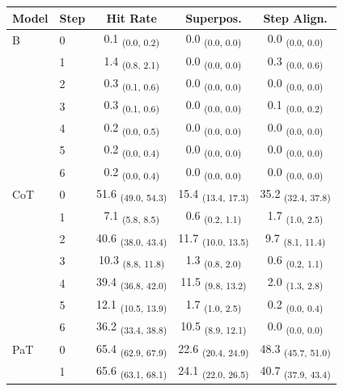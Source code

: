 \begin{table}[h!]
\centering
\small
\begin{tabular}{ll ccc}
\toprule
\textbf{Model} & \textbf{Step} & \textbf{Hit Rate} & \textbf{Superpos.} & \textbf{Step Align.} \\
\midrule
B & 0 & 0.1 \textsubscript{(0.0, 0.2)} & 0.0 \textsubscript{(0.0, 0.0)} & 0.0 \textsubscript{(0.0, 0.0)} \\
 & 1 & 1.4 \textsubscript{(0.8, 2.1)} & 0.0 \textsubscript{(0.0, 0.0)} & 0.3 \textsubscript{(0.0, 0.6)} \\
 & 2 & 0.3 \textsubscript{(0.1, 0.6)} & 0.0 \textsubscript{(0.0, 0.0)} & 0.0 \textsubscript{(0.0, 0.0)} \\
 & 3 & 0.3 \textsubscript{(0.1, 0.6)} & 0.0 \textsubscript{(0.0, 0.0)} & 0.1 \textsubscript{(0.0, 0.2)} \\
 & 4 & 0.2 \textsubscript{(0.0, 0.5)} & 0.0 \textsubscript{(0.0, 0.0)} & 0.0 \textsubscript{(0.0, 0.0)} \\
 & 5 & 0.2 \textsubscript{(0.0, 0.4)} & 0.0 \textsubscript{(0.0, 0.0)} & 0.0 \textsubscript{(0.0, 0.0)} \\
 & 6 & 0.2 \textsubscript{(0.0, 0.4)} & 0.0 \textsubscript{(0.0, 0.0)} & 0.0 \textsubscript{(0.0, 0.0)} \\
\midrule
CoT & 0 & 51.6 \textsubscript{(49.0, 54.3)} & 15.4 \textsubscript{(13.4, 17.3)} & 35.2 \textsubscript{(32.4, 37.8)} \\
 & 1 & 7.1 \textsubscript{(5.8, 8.5)} & 0.6 \textsubscript{(0.2, 1.1)} & 1.7 \textsubscript{(1.0, 2.5)} \\
 & 2 & 40.6 \textsubscript{(38.0, 43.4)} & 11.7 \textsubscript{(10.0, 13.5)} & 9.7 \textsubscript{(8.1, 11.4)} \\
 & 3 & 10.3 \textsubscript{(8.8, 11.8)} & 1.3 \textsubscript{(0.8, 2.0)} & 0.6 \textsubscript{(0.2, 1.1)} \\
 & 4 & 39.4 \textsubscript{(36.8, 42.0)} & 11.5 \textsubscript{(9.8, 13.2)} & 2.0 \textsubscript{(1.3, 2.8)} \\
 & 5 & 12.1 \textsubscript{(10.5, 13.9)} & 1.7 \textsubscript{(1.0, 2.5)} & 0.2 \textsubscript{(0.0, 0.4)} \\
 & 6 & 36.2 \textsubscript{(33.4, 38.8)} & 10.5 \textsubscript{(8.9, 12.1)} & 0.0 \textsubscript{(0.0, 0.0)} \\
\midrule
PaT & 0 & 65.4 \textsubscript{(62.9, 67.9)} & 22.6 \textsubscript{(20.4, 24.9)} & 48.3 \textsubscript{(45.7, 51.0)} \\
 & 1 & 65.6 \textsubscript{(63.1, 68.1)} & 24.1 \textsubscript{(22.0, 26.5)} & 40.7 \textsubscript{(37.9, 43.4)} \\

\end{tabular}
\end{table}
